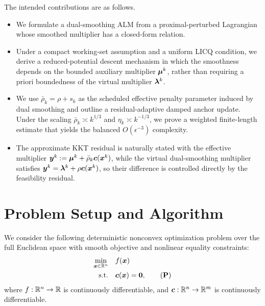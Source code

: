 \documentclass[10pt]{article}
\begin{document}
The intended contributions are as follows.
\begin{itemize}
    \item We formulate a dual-smoothing ALM from a proximal-perturbed
    Lagrangian whose smoothed multiplier has a closed-form relation.
    \item Under a compact working-set assumption and a uniform LICQ
    condition, we derive a reduced-potential descent mechanism in which the
    smoothness depends on the bounded auxiliary multiplier $\bm{\mu}^k$, rather
    than requiring a priori boundedness of the virtual multiplier
    $\bm{\lambda}^k$.
    \item We use $\bar\rho_k=\rho+s_k$ as the scheduled effective penalty
    parameter induced by dual smoothing and outline a residual-adaptive
    damped anchor update.  Under the scaling
    $\bar\rho_k\asymp k^{1/3}$ and $\eta_k\asymp k^{-1/3}$, we prove a
    weighted finite-length estimate that yields the balanced
    $O(\epsilon^{-3})$ complexity.
    \item The approximate KKT residual is naturally stated with the effective
    multiplier
    $\bm{y}^k:=\bm{\mu}^k+\bar\rho_k\bm{c}(\bm{x}^k)$, while the virtual
    dual-smoothing multiplier satisfies
    $\bm{y}^k=\bm{\lambda}^k+\rho\bm{c}(\bm{x}^k)$, so their difference is controlled
    directly by the feasibility residual.
\end{itemize}

\section{Problem Setup and Algorithm}
\label{sec:method}

We consider the following deterministic nonconvex optimization problem over
the full Euclidean space with smooth objective and nonlinear equality
constraints:
\begin{align}
    \min_{\bx\in\RR^n}\quad & f(\bx) \notag\\
    \text{s.t.}\quad & \bc(\bx)=\zero, \tag{\textbf{P}}
\end{align}
where $f:\mathbb{R}^n\to\mathbb{R}$ is continuously differentiable, and
$\bm{c}:\mathbb{R}^n\to\mathbb{R}^m$ is continuously differentiable.
\end{document}
